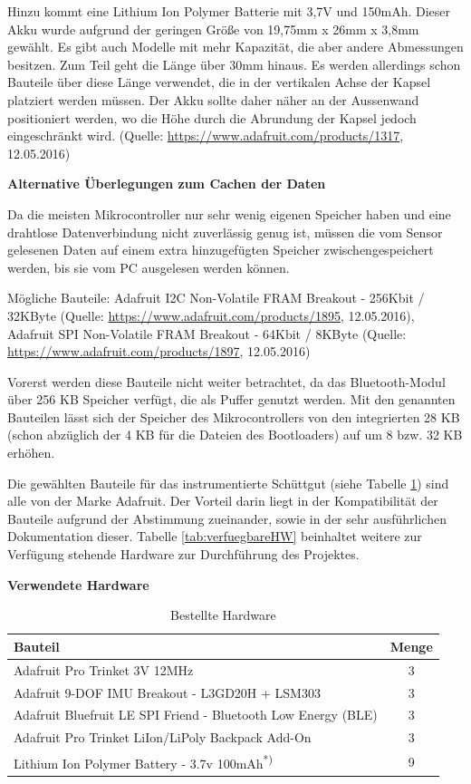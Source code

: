 Hinzu kommt eine Lithium Ion Polymer Batterie mit 3,7V und 150mAh. Dieser Akku wurde aufgrund der geringen Größe von 19,75mm x 26mm x 3,8mm gewählt. Es gibt auch Modelle mit mehr Kapazität, die aber andere Abmessungen besitzen. Zum Teil geht die Länge über 30mm hinaus. Es werden allerdings schon Bauteile über diese Länge verwendet, die in der vertikalen Achse der Kapsel platziert werden müssen. Der Akku sollte daher näher an der Aussenwand positioniert werden, wo die Höhe durch die Abrundung der Kapsel jedoch eingeschränkt wird. (Quelle: \url{https://www.adafruit.com/products/1317}, 12.05.2016)

\textbf{Alternative Überlegungen zum Cachen der Daten}

Da die meisten Mikrocontroller nur sehr wenig eigenen Speicher haben und eine drahtlose Datenverbindung nicht zuverlässig genug ist, müssen die vom Sensor gelesenen Daten auf einem extra hinzugefügten Speicher zwischengespeichert werden, bis sie vom PC ausgelesen werden können.

Mögliche Bauteile: Adafruit I2C Non-Volatile FRAM Breakout - 256Kbit / 32KByte (Quelle: \url{https://www.adafruit.com/products/1895}, 12.05.2016), Adafruit SPI Non-Volatile FRAM Breakout - 64Kbit / 8KByte (Quelle: \url{https://www.adafruit.com/products/1897}, 12.05.2016) 

Vorerst werden diese Bauteile nicht weiter betrachtet, da das Bluetooth-Modul über 256 KB Speicher verfügt, die als Puffer genutzt werden.
Mit den genannten Bauteilen lässt sich der Speicher des Mikrocontrollers von den integrierten 28 KB (schon abzüglich der 4 KB für die Dateien des Bootloaders) auf um 8 bzw. 32  KB erhöhen. 

Die gewählten Bauteile für das instrumentierte Schüttgut (siehe Tabelle \ref{tab:bestellteHW}) sind alle von der Marke Adafruit. Der Vorteil darin liegt in der Kompatibilität der Bauteile aufgrund der Abstimmung zueinander, sowie in der sehr ausführlichen Dokumentation dieser. Tabelle \ref{tab:verfuegbareHW} beinhaltet weitere zur Verfügung stehende Hardware zur Durchführung des Projektes.

\textbf{Verwendete Hardware}

\begin{table}[h]
	\centering
	\begin{tabular}{|l|c|}
		\hline
		\textbf{Bauteil} & \textbf{Menge} \\
		\hline
		 Adafruit Pro Trinket 3V 12MHz & 3 \\
		 \hline
		 Adafruit 9-DOF IMU Breakout - L3GD20H + LSM303 & 3 \\
		 \hline
		 Adafruit Bluefruit LE SPI Friend - Bluetooth Low Energy (BLE) & 3 \\
		 \hline
		 Adafruit Pro Trinket LiIon/LiPoly Backpack Add-On & 3 \\
		 \hline
		 Lithium Ion Polymer Battery - 3.7v 100mAh\textsuperscript{*)} & 9 \\
		 \hline		 
	\end{tabular}
		\caption{Bestellte Hardware}
		\label{tab:bestellteHW}
\end{table}

